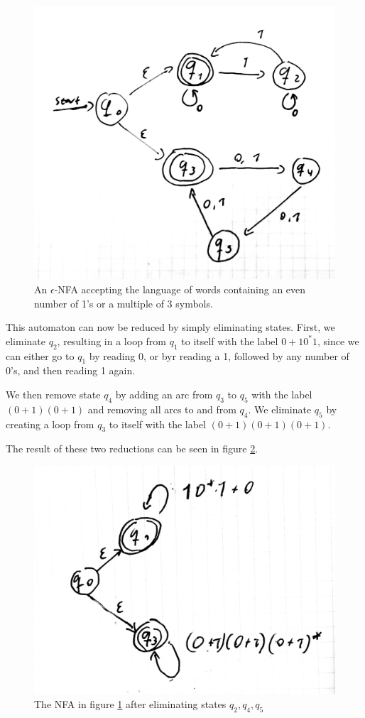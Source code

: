 \documentclass{article}
\begin{document}
\begin{figure}[htpb]
    \centering
    \includegraphics[width=0.8\linewidth]{epsnfa}
    \caption{An $\epsilon$-NFA accepting the language of words containing an even number of 1's or a multiple of 3 symbols.}
    \label{fig:epsnfa}
\end{figure}

This automaton can now be reduced by simply eliminating states. First, we eliminate $q_2$, resulting in a loop from $q_1$ to itself with the label $0+10^*1$, since we can either go to $q_1$ by reading 0, or byr reading a 1, followed by any number of 0's, and then reading 1 again.

We then remove state $q_4$ by adding an arc from $q_3$ to $q_5$ with the label $(0+1)(0+1)$ and removing all arcs to and from $q_4$. We eliminate $q_5$ by creating a loop from $q_3$ to itself with the label $(0+1)(0+1)(0+1)$.

The result of these two reductions can be seen in figure \ref{fig:epsnfa-eliminated}.

\begin{figure}[htpb]
    \centering
    \includegraphics[width=0.8\linewidth]{epsnfa-eliminated}
    \caption{The NFA in figure \ref{fig:epsnfa} after eliminating states $q_2,q_4,q_5$}
    \label{fig:epsnfa-eliminated}
\end{figure}
\end{document}
